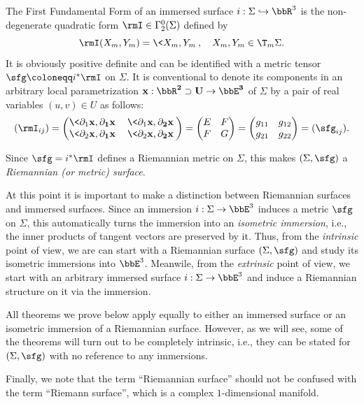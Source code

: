 \begin{defn}
    The First Fundamental Form of an immersed surface $i:\Sigma\hookrightarrow \bbR^3$ is the non-degenerate quadratic form $\rmI\in\Gamma^0_2(\Sigma)$ defined by 
    \[\rmI(X_m,Y_m)=\<X_m,Y_m\>,\quad X_m,Y_m\in \T_m \Sigma.\]
    It is obviously positive definite and can be identified with a metric tensor $\sfg\coloneqq i^\ast\rmI$ on $\Sigma$. It is conventional to denote its components in an arbitrary local parametrization $\bf{ x}: \bbR^2\supset U\to\bbE^3$ of $\Sigma$ by a pair of real variables $(u,v)\in U$ as follows:
    \[(\rmI_{ij})=
    \begin{pmatrix}
        \<\partial_1\bf{x},\partial_1\bf{x}\> & \<\partial_1\bf{x},\partial_2\bf{x}\>\\
        \<\partial_2\bf{x},\partial_1\bf{x}\> & \<\partial_2\bf{x},\partial_2\bf{x}\>
    \end{pmatrix}
    =\begin{pmatrix}
        E&F\\
        F& G
    \end{pmatrix}=\begin{pmatrix}
        g_{11}&g_{12}\\
        g_{21}& g_{22}
    \end{pmatrix}=(\sfg_{ij}).\label{eq fff}\]
\end{defn}

Since $\sfg= i^\ast \rmI$ defines a Riemannian metric on $\Sigma$, this makes $(\Sigma,\sfg)$ a \emph{Riemannian (or metric) surface}.

\begin{rem}
    At this point it is important to make a distinction between Riemannian surfaces and immersed surfaces. Since an immersion $i:\Sigma\to \bbE^3$ induces a metric $\sfg$ on $\Sigma$, this automatically turns the immersion into an \emph{isometric immersion}, i.e., the inner products of tangent vectors are preserved by it. Thus, from the \emph{intrinsic} point of view, we are can start with a Riemannian surface $(\Sigma,\sfg)$ and study its isometric immersions into $\bbE^3$. Meanwile, from the \emph{extrinsic} point of view, we start with an arbitrary immersed surface $i:\Sigma\to \bbE^3$ and induce a Riemannian structure on it via the immersion. 
    
    All theorems we prove below apply equally to either an immersed surface or an isometric immersion of a Riemannian surface. However, as we will see, some of the theorems will turn out to be completely intrinsic, i.e., they can be stated for $(\Sigma,\sfg)$ with no reference to any immersions.

    Finally, we note that the term ``Riemannian surface'' should not be confused with the term ``Riemann surface'', which is a complex $1$-dimensional manifold.
\end{rem}


